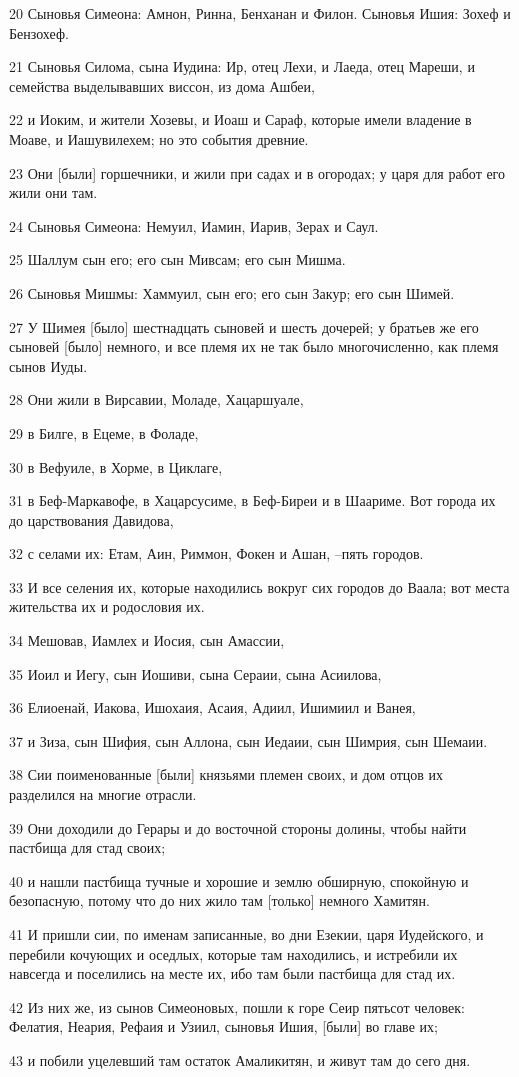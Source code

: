 \par 20 Сыновья Симеона: Амнон, Ринна, Бенханан и Филон. Сыновья Ишия: Зохеф и Бензохеф.
\par 21 Сыновья Силома, сына Иудина: Ир, отец Лехи, и Лаеда, отец Мареши, и семейства выделывавших виссон, из дома Ашбеи,
\par 22 и Иоким, и жители Хозевы, и Иоаш и Сараф, которые имели владение в Моаве, и Иашувилехем; но это события древние.
\par 23 Они [были] горшечники, и жили при садах и в огородах; у царя для работ его жили они там.
\par 24 Сыновья Симеона: Немуил, Иамин, Иарив, Зерах и Саул.
\par 25 Шаллум сын его; его сын Мивсам; его сын Мишма.
\par 26 Сыновья Мишмы: Хаммуил, сын его; его сын Закур; его сын Шимей.
\par 27 У Шимея [было] шестнадцать сыновей и шесть дочерей; у братьев же его сыновей [было] немного, и все племя их не так было многочисленно, как племя сынов Иуды.
\par 28 Они жили в Вирсавии, Моладе, Хацаршуале,
\par 29 в Билге, в Ецеме, в Фоладе,
\par 30 в Вефуиле, в Хорме, в Циклаге,
\par 31 в Беф-Маркавофе, в Хацарсусиме, в Беф-Биреи и в Шаариме. Вот города их до царствования Давидова,
\par 32 с селами их: Етам, Аин, Риммон, Фокен и Ашан, --пять городов.
\par 33 И все селения их, которые находились вокруг сих городов до Ваала; вот места жительства их и родословия их.
\par 34 Мешовав, Иамлех и Иосия, сын Амассии,
\par 35 Иоил и Иегу, сын Иошиви, сына Сераии, сына Асиилова,
\par 36 Елиоенай, Иакова, Ишохаия, Асаия, Адиил, Ишимиил и Ванея,
\par 37 и Зиза, сын Шифия, сын Аллона, сын Иедаии, сын Шимрия, сын Шемаии.
\par 38 Сии поименованные [были] князьями племен своих, и дом отцов их разделился на многие отрасли.
\par 39 Они доходили до Герары и до восточной стороны долины, чтобы найти пастбища для стад своих;
\par 40 и нашли пастбища тучные и хорошие и землю обширную, спокойную и безопасную, потому что до них жило там [только] немного Хамитян.
\par 41 И пришли сии, по именам записанные, во дни Езекии, царя Иудейского, и перебили кочующих и оседлых, которые там находились, и истребили их навсегда и поселились на месте их, ибо там были пастбища для стад их.
\par 42 Из них же, из сынов Симеоновых, пошли к горе Сеир пятьсот человек: Фелатия, Неария, Рефаия и Узиил, сыновья Ишия, [были] во главе их;
\par 43 и побили уцелевший там остаток Амаликитян, и живут там до сего дня.

